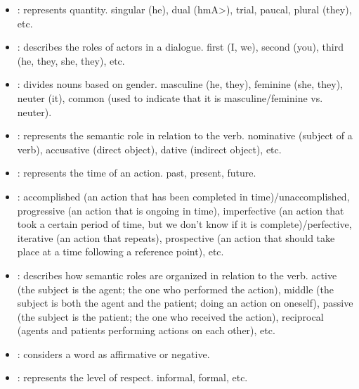 \documentclass{KBook}
\begin{document}
\begin{itemize}
	\item {}: represents quantity. singular (he), dual (\<hmA>), trial, paucal, plural (they), etc.
	
	\item {}: describes the roles of actors in a dialogue. first (I, we), second (you), third (he, they, she, they), etc.
	
	\item {}: divides nouns based on gender. masculine (he, they), feminine (she, they), neuter (it), common (used to indicate that it is masculine/feminine vs. neuter).
	
	\item {}: represents the semantic role in relation to the verb. nominative (subject of a verb), accusative (direct object), dative (indirect object), etc.
	
	\item {}: represents the time of an action. past, present, future.
	
	\item {}: accomplished (an action that has been completed in time)/unaccomplished, progressive (an action that is ongoing in time), imperfective (an action that took a certain period of time, but we don't know if it is complete)/perfective, iterative (an action that repeats), prospective (an action that should take place at a time following a reference point), etc.
	
	\item {}: describes how semantic roles are organized in relation to the verb. active (the subject is the agent; the one who performed the action), middle (the subject is both the agent and the patient; doing an action on oneself), passive (the subject is the patient; the one who received the action), reciprocal (agents and patients performing actions on each other), etc.
	
	\item {}: considers a word as affirmative or negative.
	\item {}: represents the level of respect. informal, formal, etc.
\end{itemize}
\end{document}
